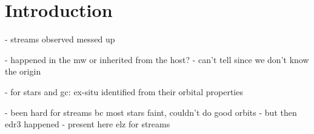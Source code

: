 \documentclass[twocolumn]{aastex63}
\begin{document}

\section{Introduction}
\label{sec:intro}

- streams observed messed up

- happened in the mw or inherited from the host?
- can't tell since we don't know the origin

- for stars and gc: ex-situ identified from their orbital properties

- been hard for streams bc most stars faint, couldn't do good orbits
- but then edr3 happened
- present here elz for streams

\end{document}
